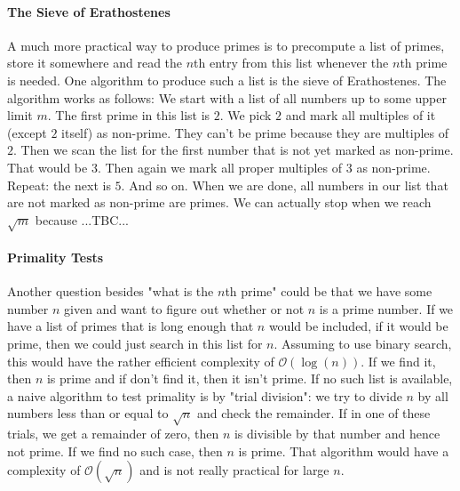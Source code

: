 \paragraph{The Sieve of Erathostenes}
A much more practical way to produce primes is to precompute a list of primes, store it somewhere and read the $n$th entry from this list whenever the $n$th prime is needed. One algorithm to produce such a list is the sieve of Erathostenes. The algorithm works as follows: We start with a list of all numbers up to some upper limit $m$. The first prime in this list is $2$. We pick $2$ and mark all multiples of it (except $2$ itself) as non-prime. They can't be prime because they are multiples of $2$. Then we scan the list for the first number that is not yet marked as non-prime. That would be $3$. Then again we mark all proper multiples of $3$ as non-prime. Repeat: the next is $5$. And so on. When we are done, all numbers in our list that are not marked as non-prime are primes. We can actually stop when we reach $\sqrt{m}$ because ...TBC...



\paragraph{Primality Tests}
Another question besides "what is the $n$th prime" could be that we have some number $n$ given and want to figure out whether or not $n$ is a prime number. If we have a list of primes that is long enough that $n$ would be included, if it would be prime, then we could just search in this list for $n$. Assuming to use binary search, this would have the rather efficient complexity of $\mathcal{O}(\log(n))$. If we find it, then $n$ is prime and if don't find it, then it isn't prime. If no such list is available, a naive algorithm to test primality is by "trial division": we try to divide $n$ by all numbers less than or equal to $\sqrt{n}$ and check the remainder. If in one of these trials, we get a remainder of zero, then $n$ is divisible by that number and hence not prime. If we find no such case, then $n$ is prime. That algorithm would have a complexity of $\mathcal{O}(\sqrt{n})$ and is not really practical for large $n$.


